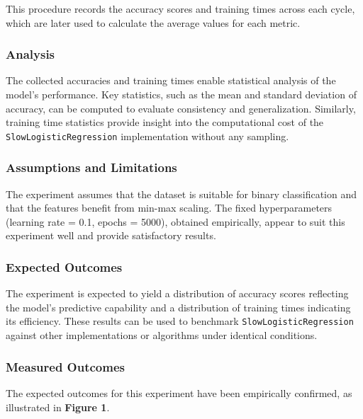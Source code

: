 \documentclass{article}
\theoremstyle{plain}
\theoremstyle{definition}
\theoremstyle{remark}
\begin{document}
This procedure records the accuracy scores and training times across each cycle, which are later used to calculate the average values for each metric.


\subsubsection{Analysis}

The collected accuracies and training times enable statistical analysis of the model's performance. Key statistics, such as the mean and standard deviation of accuracy, can be computed to evaluate consistency and generalization. Similarly, training time statistics provide insight into the computational cost of the \texttt{SlowLogisticRegression} implementation without any sampling.


\subsubsection{Assumptions and Limitations}

The experiment assumes that the dataset is suitable for binary classification and that the features benefit from min-max scaling. The fixed hyperparameters (learning rate = 0.1, epochs = 5000), obtained empirically, appear to suit this experiment well and provide satisfactory results.


\subsubsection{Expected Outcomes}

The experiment is expected to yield a distribution of accuracy scores reflecting the model's predictive capability and a distribution of training times indicating its efficiency. These results can be used to benchmark \texttt{SlowLogisticRegression} against other implementations or algorithms under identical conditions.

\subsubsection{Measured Outcomes}

The expected outcomes for this experiment have been empirically confirmed, as illustrated in \textbf{Figure 1}.
\end{document}
